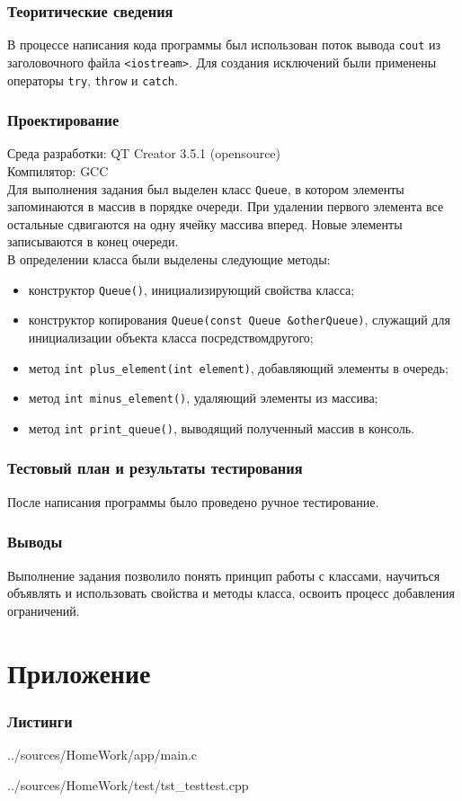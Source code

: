 \documentclass[12pt,a4paper]{report}
\begin{document}
\subsection{Теоритические сведения}
В процессе написания кода программы был использован поток вывода \verb+cout+ из заголовочного файла \verb+<iostream>+. Для создания исключений были применены операторы \verb+try+, \verb+throw+ и \verb+catch+.
  
\subsection{Проектирование}
Среда разработки: QT Creator 3.5.1 (opensource)
\\
Компилятор: GCC
\\
Для выполнения задания был выделен класс \verb+Queue+, в котором элементы запоминаются в массив в порядке очереди. При удалении первого элемента все остальные сдвигаются на одну ячейку массива вперед. Новые элементы записываются в конец очереди.
\\
В определении класса были выделены следующие методы:
\begin{itemize}
\item конструктор \verb+Queue()+, инициализирующий свойства класса;
\item конструктор копирования \verb+Queue(const Queue &otherQueue)+, служащий для инициализации объекта класса посредствомдругого;
\item метод \verb+int plus_element(int element)+, добавляющий элементы в очередь;
\item метод \verb+int minus_element()+, удаляющий элементы из массива;
\item метод \verb+int print_queue()+, выводящий полученный массив в консоль.
\end{itemize}

\subsection{Тестовый план и результаты тестирования}
После написания программы было проведено ручное тестирование.


\subsection{Выводы}
Выполнение задания позволило понять принцип работы с классами, научиться объявлять и использовать свойства и методы класса, освоить процесс добавления ограничений.



\chapter{Приложение}
\subsection*{Листинги}


{../sources/HomeWork/app/main.c}


{../sources/HomeWork/test/tst_testtest.cpp}
\end{document}
